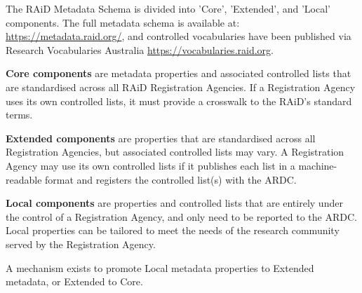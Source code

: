 The RAiD Metadata Schema is divided into 'Core', 'Extended', and 'Local' components. The full metadata schema is available at: \href{https://metadata.raid.org/}{https://metadata.raid.org/}, and controlled vocabularies have been published via Research Vocabularies Australia \href{https://vocabulary.raid.org}{https://vocabularies.raid.org}.

\textbf{Core components} are metadata properties and associated controlled lists that are standardised across all RAiD Registration Agencies. If a Registration Agency uses its own controlled lists, it must provide a crosswalk to the RAiD’s standard terms.

\textbf{Extended components} are properties that are standardised across all Registration Agencies, but associated controlled lists may vary. A Registration Agency may use its own controlled lists if it publishes each list in a machine-readable format and registers the controlled list(s) with the ARDC. 

\textbf{Local components} are properties and controlled lists that are entirely under the control of a Registration Agency, and only need to be reported to the ARDC. Local properties can be tailored to meet the needs of the research community served by the Registration Agency. 

A mechanism exists to promote Local metadata properties to Extended metadata, or Extended to Core.